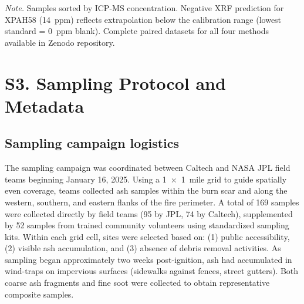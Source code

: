 \documentclass[journal=esthag,manuscript=suppinfo]{achemso}
\begin{document}
\textit{Note.} Samples sorted by ICP-MS concentration. Negative XRF prediction for XPAH58 (14~ppm) reflects extrapolation below the calibration range (lowest standard = 0~ppm blank). Complete paired datasets for all four methods available in Zenodo repository.

\newpage


\section*{S3. Sampling Protocol and Metadata}

\subsection*{Sampling campaign logistics}

The sampling campaign was coordinated between Caltech and NASA JPL field teams beginning January 16, 2025. Using a 1~$\times$~1~mile grid to guide spatially even coverage, teams collected ash samples within the burn scar and along the western, southern, and eastern flanks of the fire perimeter. A total of 169 samples were collected directly by field teams (95 by JPL, 74 by Caltech), supplemented by 52 samples from trained community volunteers using standardized sampling kits. Within each grid cell, sites were selected based on: (1) public accessibility, (2) visible ash accumulation, and (3) absence of debris removal activities. As sampling began approximately two weeks post-ignition, ash had accumulated in wind-traps on impervious surfaces (sidewalks against fences, street gutters). Both coarse ash fragments and fine soot were collected to obtain representative composite samples.
\end{document}
